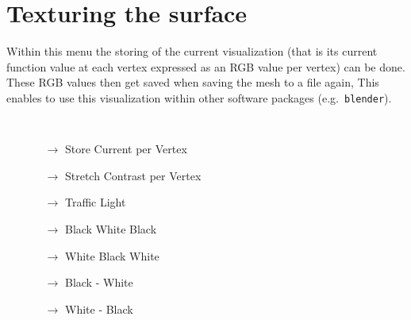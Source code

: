 \section{Texturing the surface}\label{texture} 
Within this menu the storing of the current visualization (that is its current function value at each vertex expressed as an RGB value per vertex) can be done. These RGB values then get saved when saving the mesh to a file again, This enables to use this visualization within other software packages (e.g.~{\tt blender}).
{\tt
\begin{itemize}
\item[] 
 \begin{itemize}
 \item[$\rightarrow$] Store Current per Vertex
 \item[$\rightarrow$] Stretch Contrast per Vertex
 \color{gray}
 \item[$\rightarrow$] Traffic Light
 \item[$\rightarrow$] Black White Black
 \item[$\rightarrow$] White Black White
 \item[$\rightarrow$] Black - White
 \item[$\rightarrow$] White - Black
 \color{black}
 \end{itemize}
 \end{itemize}
 }


